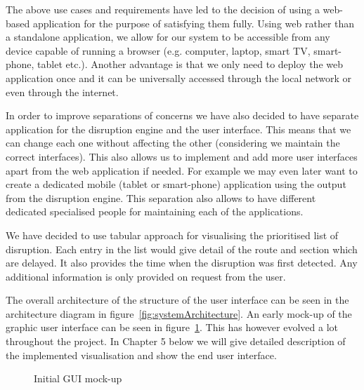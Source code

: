The above use cases and requirements have led to the decision of using a web-based application for the purpose of satisfying them fully. Using web rather than a standalone application, we allow for our system to be accessible from any device capable of running a browser (e.g. computer, laptop, smart TV, smart-phone, tablet etc.). Another advantage is that we only need to deploy the web application once and it can be universally accessed through the local network or even through the internet.

In order to improve separations of concerns we have also decided to have separate application for the disruption engine and the user interface. This means that we can change each one without affecting the other (considering we maintain the correct interfaces). This also allows us to implement and add more user interfaces apart from the web application if needed. For example we may even later want to create a dedicated mobile (tablet or smart-phone) application using the output from the disruption engine. This separation also allows to have different dedicated specialised people for maintaining each of the applications.

We have decided to use tabular approach for visualising the prioritised list of disruption. Each entry in the list would give detail of the route and section which are delayed. It also provides the time when the disruption was first detected. Any additional information is only provided on request from the user.

The overall architecture of the structure of the user interface can be seen in the architecture diagram in figure~\ref{fig:systemArchitecture}. An early mock-up of the graphic user interface can be seen in figure~\ref{fig:guiProposal}. This has however evolved a lot throughout the project. In Chapter 5 below we will give detailed description of the implemented visualisation and show the end user interface.


\begin{figure}[ht]
	\caption{Initial GUI mock-up}
	\label{fig:guiProposal}
\end{figure}